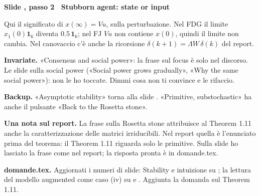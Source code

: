 \par\addvspace{14pt}\noindent\begin{minipage}{\textwidth}
{\color{unipd}\bfseries Slide , passo 2 \textperiodcentered\ Stubborn agent: state or input}\par\smallskip
{\small Qui il significato di $x(\infty) = Vu$, sulla perturbazione. Nel FDG il limite $x_1(0)\mathbf{1}_6$ diventa $0.5\,\mathbf{1}_6$; nel FJ $Vu$ non contiene $x(0)$, quindi il limite non cambia. Nel canovaccio c'è anche la ricorsione $\delta(k+1) = \Lambda W\,\delta(k)$ del report.}\par\smallskip
\noindent\begin{minipage}[t]{0.36\textwidth}\par
{}\par\smallskip
\end{minipage}\hfill\begin{minipage}[t]{0.61\textwidth}\par
{}\par\smallskip
\end{minipage}\par
\end{minipage}\par
\par\smallskip\noindent \textbf{Invariate.} «Consensus and social power»: la frase sul focus è solo nel discorso. Le slide sulla social power («Social power grows gradually», «Why the same social power»): non le ho toccate. Dimmi cosa non ti convince e le rifaccio.\par
\par\smallskip\noindent \textbf{Backup.} «Asymptotic stability» torna alla slide . «Primitive, substochastic» ha anche il pulsante «Back to the Rosetta stone».\par
\par\smallskip\noindent \textbf{Una nota sul report.} La frase sulla Rosetta stone attribuisce al Theorem 1.11 anche la caratterizzazione delle matrici irriducibili. Nel report quella è l'enunciato prima del teorema: il Theorem 1.11 riguarda solo le primitive. Sulla slide ho lasciato la frase come nel report; la risposta pronta è in domande.tex.\par
\par\smallskip\noindent \textbf{domande.tex.} Aggiornati i numeri di slide: Stability e intuizione su ; la lettura del modello augmented come caso (iv) su  e . Aggiunta la domanda sul Theorem 1.11.\par
\clearpage
